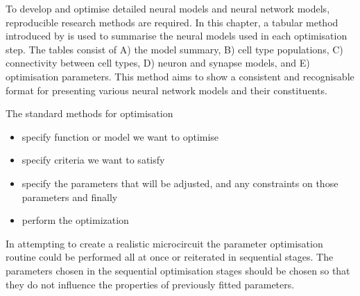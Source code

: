 \medskip{}

To develop and optimise detailed neural models and neural network models,
reproducible research methods are required. In this chapter, a tabular
method introduced by \citet{NordlieGewaltigEtAl:2009} is used to summarise the neural
models used in each optimisation step. The tables consist of A) the model
summary, B) cell type populations, C) connectivity between cell types, D) neuron
and synapse models, and E) optimisation parameters.  This method aims to show a
consistent and recognisable format for presenting various neural network models
and their constituents. 


The standard methods for optimisation \begin{itemize}
\item specify function or model we want to optimise
\item specify criteria we want to satisfy
\item specify the parameters that will be adjusted, 
    and any constraints on those parameters and finally
\item perform the optimization
\end{itemize}

In attempting to create a realistic microcircuit the parameter optimisation
routine could be performed all at once or reiterated in sequential stages. The
parameters chosen in the sequential optimisation stages should be chosen so that
they do not influence the properties of previously fitted parameters.

\medskip{}


